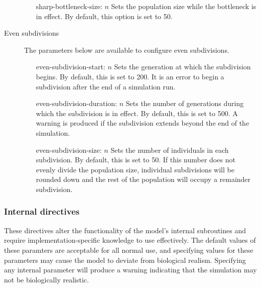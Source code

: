 \documentclass{article}
\begin{document}
\begin{description}
\begin{enumerate}
              \item[sharp-bottleneck-size: $n$]
              Sets the population size while the bottleneck is in effect. By
              default, this option is set to 50.
            \end{enumerate}

          \item[Even subdivisions] The parameters below are available to
	  configure even subdivisions.

            \begin{enumerate}
              \item[even-subdivision-start: $n$]
              Sets the generation at which the subdivision begins. By default,
              this is set to 200. It is an error to begin a subdivision after
              the end of a simulation run.

              \item[even-subdivision-duration: $n$]
              Sets the number of generations during which the subdivision is in
              effect. By default, this is set to 500. A warning is produced if
              the subdivision extends beyond the end of the simulation.

              \item[even-subdivision-size: $n$]
              Sets the number of individuals in each subdivision. By default,
              this is set to 50. If this number does not evenly divide the
              population size, individual subdivisions will be rounded down and
              the rest of the population will occupy a remainder subdivision.
            \end{enumerate}
        \end{description}

      \subsubsection{Internal directives}
        \label{sec:internal-directives}

        These directives alter the functionality of the model's internal
        subroutines and require implementation-specific knowledge to use
        effectively. The default values of these paramters are acceptable for
        all normal use, and specifying values for these parameters may cause the
        model to deviate from biological realism. Specifying any internal
        parameter will produce a warning indicating that the simulation may not
        be biologically realistic.
\end{document}
